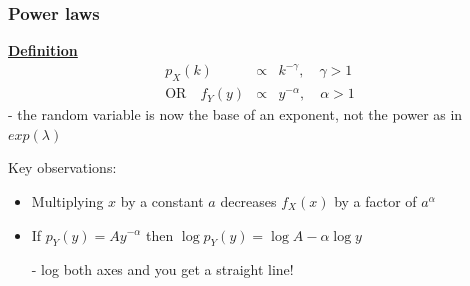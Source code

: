 \documentclass[t,8pt]{beamer}%
\begin{document}

\begin{frame}
	\frametitle{Power laws}
	{\bf\underline{Definition}}
    \begin{eqnarray*}
        p_X(k)&\propto& k^{-\gamma},\quad \gamma>1\\
        \text{OR}\quad f_Y(y)&\propto& y^{-\alpha},\quad \alpha>1
    \end{eqnarray*}
	{\small\color{NavyBlue} - the random variable is now the base of an exponent, not the power as in $exp(\lambda)$} \par
    Key observations:
    \begin{itemize}
        \item Multiplying $x$ by a constant $a$ decreases $f_X(x)$ by a factor of $a^{\alpha}$
        \item If $p_Y(y)=Ay^{-\alpha}$ then $\log p_Y(y)=\log A-\alpha\log y$ \par 
        - log both axes and you get a straight line!
    \end{itemize}
\end{frame}
\end{document}
